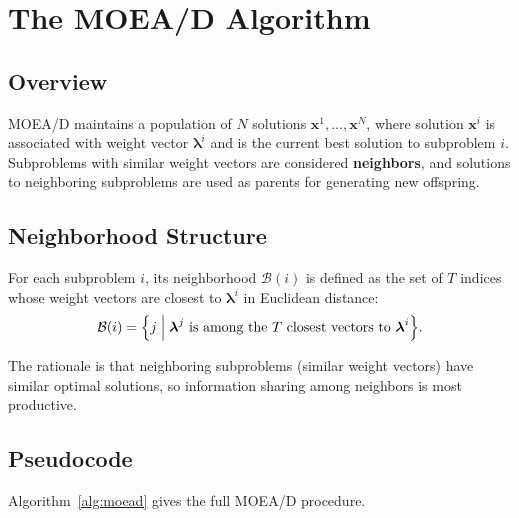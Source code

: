 \documentclass[12pt,a4paper]{article}
\begin{document}
\section{The MOEA/D Algorithm}
\label{sec:algorithm}

\subsection{Overview}

MOEA/D maintains a population of $N$ solutions $\mathbf{x}^1, \ldots, \mathbf{x}^N$, where solution $\mathbf{x}^i$ is associated with weight vector $\boldsymbol{\lambda}^i$ and is the current best solution to subproblem $i$. Subproblems with similar weight vectors are considered \textbf{neighbors}, and solutions to neighboring subproblems are used as parents for generating new offspring.

\subsection{Neighborhood Structure}

For each subproblem $i$, its neighborhood $\mathcal{B}(i)$ is defined as the set of $T$ indices whose weight vectors are closest to $\boldsymbol{\lambda}^i$ in Euclidean distance:
\begin{equation}
    \mathcal{B}(i) = \Bigl\{ j \;\Big|\; \boldsymbol{\lambda}^j \text{ is among the } T \text{ closest vectors to } \boldsymbol{\lambda}^i \Bigr\}.
    \label{eq:neighborhood}
\end{equation}

The rationale is that neighboring subproblems (similar weight vectors) have similar optimal solutions, so information sharing among neighbors is most productive.

\subsection{Pseudocode}

Algorithm~\ref{alg:moead} gives the full MOEA/D procedure.
\end{document}
